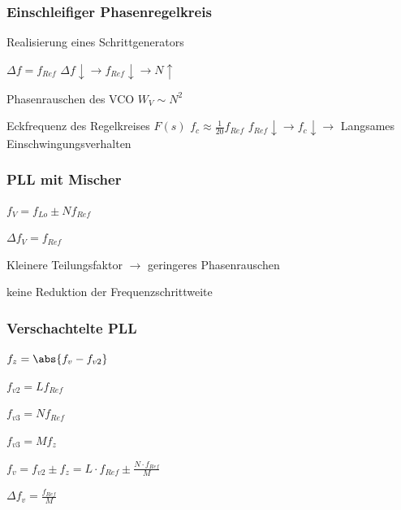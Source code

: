 \subsubsection{Einschleifiger Phasenregelkreis}
Realisierung eines Schrittgenerators


\begin{pitemize}
    \item $\Delta f = f_{Ref}$
    \subitem $\Delta f \downarrow \rightarrow f_{Ref} \downarrow \rightarrow N \uparrow$
    \item Phasenrauschen des VCO
    \subitem $W_V \sim N^2$
    \item Eckfrequenz des Regelkreises $F(s)$
    \subitem $f_c \approx \frac{1}{20} f_{Ref}$
    \subitem $f_{Ref} \downarrow \rightarrow f_c \downarrow \rightarrow$ Langsames Einschwingungsverhalten
\end{pitemize}


\subsubsection{PLL mit Mischer}


\begin{pitemize}
    \item $f_V = f_{Lo} \pm N f_{Ref}$
    \item $\Delta f_V = f_{Ref}$
    \item Kleinere Teilungsfaktor $\rightarrow$ geringeres Phasenrauschen
    \item keine Reduktion der Frequenzschrittweite
\end{pitemize}

\subsubsection{Verschachtelte PLL}



\begin{pitemize}
    \item $f_z = \abs{f_v - f_{v2}}$
    \item $f_{v2} = L f_{Ref}$
    \item $f_{v3} = N f_{Ref}$
    \item $f_{v3} = M f_{z} $
    \item $f_v = f_{v2} \pm f_z = L \cdot f_{Ref} \pm \frac{N \cdot f_{Ref}}{M}$
    \item $\Delta f_v = \frac{f_{Ref}}{M}$
\end{pitemize}


